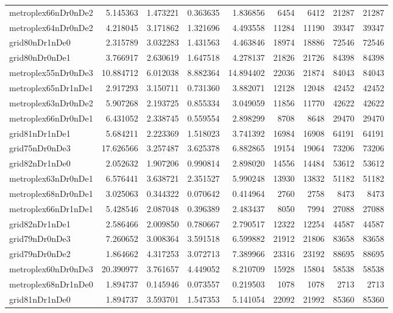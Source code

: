 \begin{longtable}{|l|r|r|r|r|r|r|r|r|}
metroplex66nDr0nDe2 & 5.145363 & 1.473221 & 0.363635 & 1.836856 & 6454 & 6412 & 21287 & 21287 \\
metroplex64nDr0nDe2 & 4.218045 & 3.171862 & 1.321696 & 4.493558 & 11284 & 11190 & 39347 & 39347 \\
grid80nDr1nDe0 & 2.315789 & 3.032283 & 1.431563 & 4.463846 & 18974 & 18886 & 72546 & 72546 \\
grid80nDr0nDe1 & 3.766917 & 2.630619 & 1.647518 & 4.278137 & 21826 & 21726 & 84398 & 84398 \\
metroplex55nDr0nDe3 & 10.884712 & 6.012038 & 8.882364 & 14.894402 & 22036 & 21874 & 84043 & 84043 \\
metroplex65nDr1nDe1 & 2.917293 & 3.150711 & 0.731360 & 3.882071 & 12128 & 12048 & 42452 & 42452 \\
metroplex63nDr0nDe2 & 5.907268 & 2.193725 & 0.855334 & 3.049059 & 11856 & 11770 & 42622 & 42622 \\
metroplex66nDr0nDe1 & 6.431052 & 2.338745 & 0.559554 & 2.898299 & 8708 & 8648 & 29470 & 29470 \\
grid81nDr1nDe1 & 5.684211 & 2.223369 & 1.518023 & 3.741392 & 16984 & 16908 & 64191 & 64191 \\
grid75nDr0nDe3 & 17.626566 & 3.257487 & 3.625378 & 6.882865 & 19154 & 19064 & 73206 & 73206 \\
grid82nDr1nDe0 & 2.052632 & 1.907206 & 0.990814 & 2.898020 & 14556 & 14484 & 53612 & 53612 \\
metroplex63nDr0nDe1 & 6.576441 & 3.638721 & 2.351527 & 5.990248 & 13930 & 13832 & 51182 & 51182 \\
metroplex68nDr0nDe1 & 3.025063 & 0.344322 & 0.070642 & 0.414964 & 2760 & 2758 & 8473 & 8473 \\
metroplex66nDr1nDe1 & 5.428546 & 2.087048 & 0.396389 & 2.483437 & 8050 & 7994 & 27088 & 27088 \\
grid82nDr1nDe1 & 2.586466 & 2.009850 & 0.780667 & 2.790517 & 12322 & 12254 & 44587 & 44587 \\
grid79nDr0nDe3 & 7.260652 & 3.008364 & 3.591518 & 6.599882 & 21912 & 21806 & 83658 & 83658 \\
grid79nDr0nDe2 & 1.864662 & 4.317253 & 3.072713 & 7.389966 & 23316 & 23192 & 88695 & 88695 \\
metroplex60nDr0nDe3 & 20.390977 & 3.761657 & 4.449052 & 8.210709 & 15928 & 15804 & 58538 & 58538 \\
metroplex68nDr1nDe0 & 1.894737 & 0.145946 & 0.073557 & 0.219503 & 1078 & 1078 & 2713 & 2713 \\
grid81nDr1nDe0 & 1.894737 & 3.593701 & 1.547353 & 5.141054 & 22092 & 21992 & 85360 & 85360 \\

\end{longtable}
